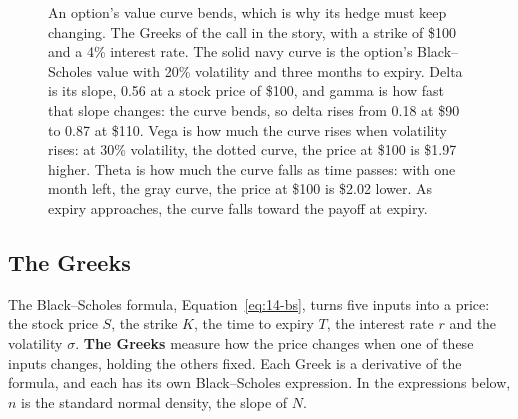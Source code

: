 \begin{figure}[htbp]
\caption{An option's value curve bends, which is why its hedge must keep changing. The Greeks of the call in the story, with a strike of \$100 and a 4\% interest rate. The solid navy curve is the option's Black--Scholes value with 20\% volatility and three months to expiry. Delta is its slope, 0.56 at a stock price of \$100, and gamma is how fast that slope changes: the curve bends, so delta rises from 0.18 at \$90 to 0.87 at \$110. Vega is how much the curve rises when volatility rises: at 30\% volatility, the dotted curve, the price at \$100 is \$1.97 higher. Theta is how much the curve falls as time passes: with one month left, the gray curve, the price at \$100 is \$2.02 lower. As expiry approaches, the curve falls toward the payoff at expiry.}
\label{fig:14-bs}
\end{figure}

\subsection{The Greeks}
\label{sec:14-greeks}

The Black--Scholes formula, Equation~\eqref{eq:14-bs}, turns five inputs into a price: the stock price $S$, the strike $K$, the time to expiry $T$, the interest rate $r$ and the volatility $\sigma$. \textbf{The Greeks} measure how the price changes when one of these inputs changes, holding the others fixed. Each Greek is a derivative of the formula, and each has its own Black--Scholes expression. In the expressions below, $n$ is the standard normal density, the slope of $N$.

